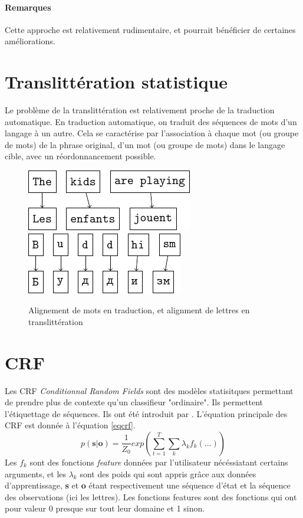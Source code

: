 \documentclass{article}
\begin{document}
\paragraph{Remarques}
Cette approche est relativement rudimentaire, et pourrait bénéficier de certaines améliorations.

\section{Translittération statistique}
Le problème de la translittération est relativement proche de la traduction automatique. En traduction automatique, on traduit des séquences de mots d'un langage à un autre. Cela se caractérise par l'association à chaque mot (ou groupe de mots) de la phrase original, d'un mot (ou groupe de mots) dans le langage cible, avec un réordonnancement possible.

\begin{figure}[H]
\caption{Alignement de mots en traduction, et alignment de lettres en translittération}
\centering
\vspace{0.3cm}
\includegraphics{word_alignment.pdf}
\hspace{0.5cm}
\includegraphics{letter_alignment.pdf}
\end{figure}

\section{CRF}
Les CRF \emph{Conditionnal Random Fields} sont des modèles statisitques permettant de prendre plus de contexte qu'un classifieur "ordinaire". Ils permettent l'étiquettage de séquences. Ils ont été introduit par \cite{Lafferty01}. L'équation principale des CRF est donnée à l'équation \ref{eqcrf}.
\begin{equation}
p(\textbf{s}|\textbf{o}) = \frac{1}{Z_0}exp(\sum_{t=1}^T\sum_k \lambda_k f_k(...))
\label{eqcrf}
\end{equation}
Les $f_k$ sont des fonctions \emph{feature} données par l'utilisateur nécéssiatant certains arguments, et les $\lambda_k$ sont des poids qui sont appris grâce aux données d'apprentissage, \textbf{s} et \textbf{o} étant respectivement une séquence d'état et la séquence des observations (ici les lettres). Les fonctions features sont des fonctions qui ont pour valeur 0 presque sur tout leur domaine et 1 sinon.
\end{document}
